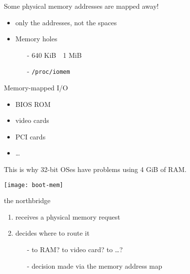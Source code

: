 \begin{frame}[plain]
  \begin{minipage}{.5\linewidth}
    \begin{block}{Some physical memory addresses are mapped away!}
      \begin{itemize}
      \item only the addresses, not the spaces
      \item Memory holes
        \begin{itemize}
        \item[-] 640 KiB~~1 MiB
        \item[-] \texttt{/proc/iomem}
        \end{itemize}
      \end{itemize}
    \end{block}
    \begin{block}{Memory-mapped I/O}
      \begin{itemize}
      \item BIOS ROM
      \item video cards
      \item PCI cards
      \item \ldots
      \end{itemize}
      This is why 32-bit OSes have problems using 4 GiB of RAM.
    \end{block}
  \end{minipage}\hfill
  \begin{minipage}{.45\linewidth}
    \texttt{[image: boot-mem]}
  \end{minipage}
\end{frame}

\begin{frame}
  \begin{block}{the northbridge}
    \begin{enumerate}
    \item receives a physical memory request
    \item decides where to route it
      \begin{itemize}
      \item[-] to RAM? to video card? to \ldots{}?
      \item[-] decision made via the \alert{memory address map}
      \end{itemize}
    \end{enumerate}
  \end{block}
\end{frame}

